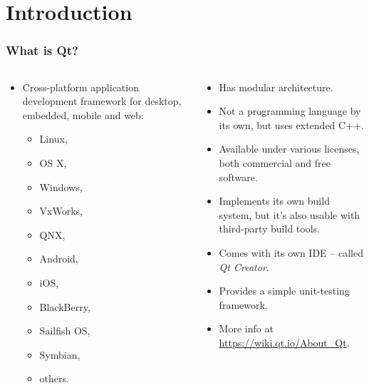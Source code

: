 \section{Introduction}

\begin{frame}
  \frametitle{What is Qt?}
  \small
  \begin{columns}
    \begin{column}{0.5\textwidth}
    \begin{itemize} 
      \item Cross-platform application development framework for desktop,
        embedded, mobile and web:
        \begin{itemize}
        \item Linux,
        \item OS X,
        \item Windows,
        \item VxWorks,
        \item QNX,
        \item Android,
        \item iOS,
        \item BlackBerry,
        \item Sailfish OS,
        \item Symbian,
        \item others.
        \end{itemize}
    \end{itemize}
    \end{column}
    \begin{column}{0.5\textwidth}
      \footnotesize
      \begin{itemize}
      \item Has modular architecture.
      \item Not a programming language by its own, but uses extended C++.
      \item Available under various licenses, both commercial and free software.
      \item Implements its own build system, but it's also usable with
      third-party build tools.
      \item Comes with its own IDE -- called {\em Qt Creator}.
      \item Provides a simple unit-testing framework.
      \item More info at \url{https://wiki.qt.io/About_Qt}.
      \end{itemize} 
    \end{column}
  \end{columns}
\end{frame}

